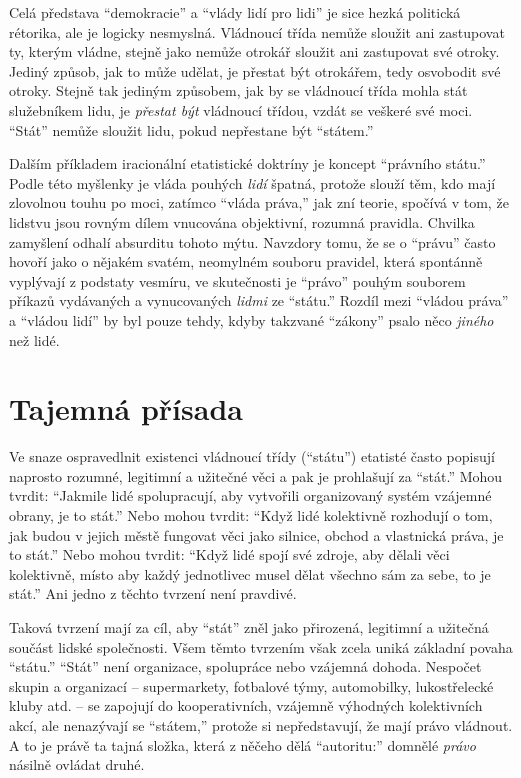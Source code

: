 \documentclass{book}
\begin{document}
Celá představa \enquote{demokracie} a \enquote{vlády lidí pro lidi} je sice hezká politická rétorika, ale je logicky nesmyslná. Vládnoucí třída nemůže sloužit ani zastupovat ty, kterým vládne, stejně jako nemůže otrokář sloužit ani zastupovat své otroky. Jediný způsob, jak to může udělat, je přestat být otrokářem, tedy osvobodit své otroky. Stejně tak jediným způsobem, jak by se vládnoucí třída mohla stát služebníkem lidu, je \emph{přestat být} vládnoucí třídou, vzdát se veškeré své moci. \enquote{Stát} nemůže sloužit lidu, pokud nepřestane být \enquote{státem.}

Dalším příkladem iracionální etatistické doktríny je koncept \enquote{právního státu.} Podle této myšlenky je vláda pouhých \emph{lidí} špatná, protože slouží těm, kdo mají zlovolnou touhu po moci, zatímco \enquote{vláda práva,} jak zní teorie, spočívá v tom, že lidstvu jsou rovným dílem vnucována objektivní, rozumná pravidla. Chvilka zamyšlení odhalí absurditu tohoto mýtu. Navzdory tomu, že se o \enquote{právu} často hovoří jako o nějakém svatém, neomylném souboru pravidel, která spontánně vyplývají z podstaty vesmíru, ve skutečnosti je \enquote{právo} pouhým souborem příkazů vydávaných a vynucovaných \emph{lidmi} ze \enquote{státu.} Rozdíl mezi \enquote{vládou práva} a \enquote{vládou lidí} by byl pouze tehdy, kdyby takzvané \enquote{zákony} psalo něco \emph{jiného} než lidé.

\section{Tajemná přísada}

Ve snaze ospravedlnit existenci vládnoucí třídy (\enquote{státu}) etatisté často popisují naprosto rozumné, legitimní a užitečné věci a pak je prohlašují za \enquote{stát.} Mohou tvrdit: \enquote{Jakmile lidé spolupracují, aby vytvořili organizovaný systém vzájemné obrany, je to stát.} Nebo mohou tvrdit: \enquote{Když lidé kolektivně rozhodují o tom, jak budou v jejich městě fungovat věci jako silnice, obchod a vlastnická práva, je to stát.} Nebo mohou tvrdit: \enquote{Když lidé spojí své zdroje, aby dělali věci kolektivně, místo aby každý jednotlivec musel dělat všechno sám za sebe, to je stát.} Ani jedno z těchto tvrzení není pravdivé.

Taková tvrzení mají za cíl, aby \enquote{stát} zněl jako přirozená, legitimní a užitečná součást lidské společnosti. Všem těmto tvrzením však zcela uniká základní povaha \enquote{státu.} \enquote{Stát} není organizace, spolupráce nebo vzájemná dohoda. Nespočet skupin a organizací -- supermarkety, fotbalové týmy, automobilky, lukostřelecké kluby atd. -- se zapojují do kooperativních, vzájemně výhodných kolektivních akcí, ale nenazývají se \enquote{státem,} protože si nepředstavují, že mají právo vládnout. A to je právě ta tajná složka, která z něčeho dělá \enquote{autoritu:} domnělé \emph{právo} násilně ovládat druhé.
\end{document}
